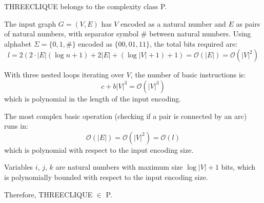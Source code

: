 \begin{solution}
	THREECLIQUE belongs to the complexity class P.

	\begin{algorithm}
		\caption{}\label{alg:3clique}
		\;
	\end{algorithm}

	The input graph $G=(V,E)$ has $V$ encoded as a natural number and $E$ as pairs of natural numbers, with separator symbol $\#$ between natural numbers. Using alphabet $\Sigma = \{0,1,\#\}$ encoded as $\{00,01,11\}$, the total bits required are:
	\[l = 2(2\cdot|E|(\log n + 1) + 2|E| + (\log|V| + 1) + 1) = \mathcal{O}(|E|) = \mathcal{O}(|V|^2)\]

	With three nested loops iterating over $V$, the number of basic instructions is:
	\[c + b|V|^3 = \mathcal{O}(|V|^3)\]
	which is polynomial in the length of the input encoding.

	The most complex basic operation (checking if a pair is connected by an arc) runs in:
	\[\mathcal{O}(|E|) = \mathcal{O}(|V|^2) = \mathcal{O}(l)\]
	which is polynomial with respect to the input encoding size.

	Variables $i$, $j$, $k$ are natural numbers with maximum size $\log|V| + 1$ bits, which is polynomially bounded with respect to the input encoding size.

	Therefore, THREECLIQUE $\in$ P.


\end{solution}

